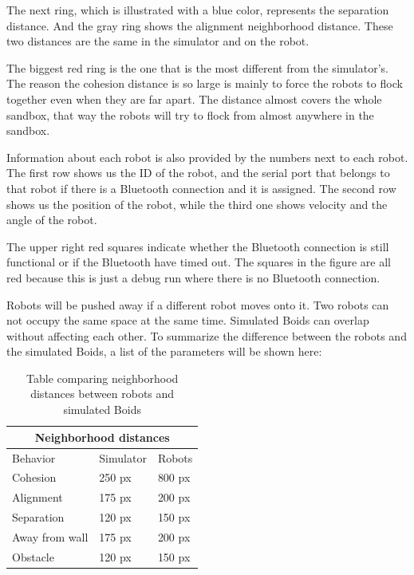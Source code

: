 The next ring, which is illustrated with a blue color, represents the separation distance. And the gray ring shows the alignment neighborhood distance. These two distances are the same in the simulator and on the robot.

The biggest red ring is the one that is the most different from the simulator's.
The reason the cohesion distance is so large is mainly to force the robots to flock together even when they are far apart. The distance almost covers the whole sandbox, that way the robots will try to flock from almost anywhere in the sandbox.


Information about each robot is also provided by the numbers next to each robot.
The first row shows us the ID of the robot, and the serial port that belongs to that robot if there is a Bluetooth connection and it is assigned.
The second row shows us the position of the robot, while the third one shows velocity and the angle of the robot.

The upper right red squares indicate whether the Bluetooth connection is still functional or if the Bluetooth have timed out. The squares in the figure are all red because this is just a debug run where there is no Bluetooth connection.

Robots will be pushed away if a different robot moves onto it. Two robots can not occupy the same space at the same time. Simulated Boids can overlap without affecting each other.
To summarize the difference between the robots and the simulated Boids, a list of the parameters will be shown here:
\begin{table}[h]
\begin{center}
\begin{tabular}{|l|l|l|}
\hline
\multicolumn{3}{|c|}{Neighborhood distances} \\ \hline
Behavior          & Simulator    & Robots    \\ \hline
Cohesion          & 250 px          & 800 px       \\ \hline
Alignment         & 175 px          & 200 px      \\ \hline
Separation        & 120 px          & 150 px      \\ \hline
Away from wall    & 175 px          & 200 px      \\ \hline
Obstacle          & 120 px          & 150 px      \\ \hline
\end{tabular}
\caption[Neighborhood distance comparison]{Table comparing neighborhood distances between robots and simulated Boids}
\end{center}
\label{tab:dists}
\end{table}

